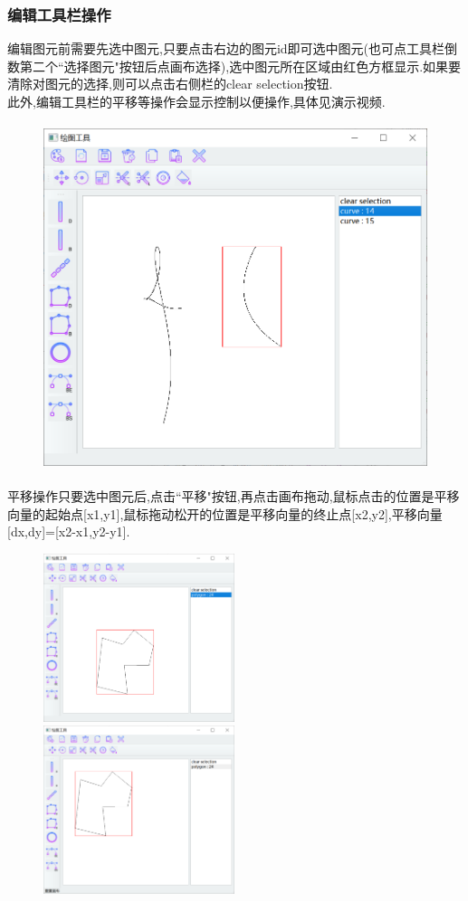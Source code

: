 \documentclass[a4paper,UTF8]{article}
\theoremstyle{definition}
\begin{document}
\subsubsection{编辑工具栏操作}
编辑图元前需要先选中图元,只要点击右边的图元id即可选中图元(也可点工具栏倒数第二个``选择图元"按钮后点画布选择),选中图元所在区域由红色方框显示.如果要清除对图元的选择,则可以点击右侧栏的clear selection按钮.\\
\indent 此外,编辑工具栏的平移等操作会显示控制以便操作,具体见演示视频.
\begin{figure}[H]
	\includegraphics[width=5in,height=4in]{choose.png}
\end{figure}
平移操作只要选中图元后,点击``平移"按钮,再点击画布拖动,鼠标点击的位置是平移向量的起始点[x1,y1],鼠标拖动松开的位置是平移向量的终止点[x2,y2],平移向量[dx,dy]=[x2-x1,y2-y1].
\begin{figure}[H]
	\centering
	\begin{minipage}[t]{0.5\linewidth}
		\includegraphics[width=2.2in]{translate1.png}
	\end{minipage}%
	\begin{minipage}[t]{0.5\linewidth}
		\includegraphics[width=2.2in]{translate2.png}
	\end{minipage}
\end{figure}
\end{document}
